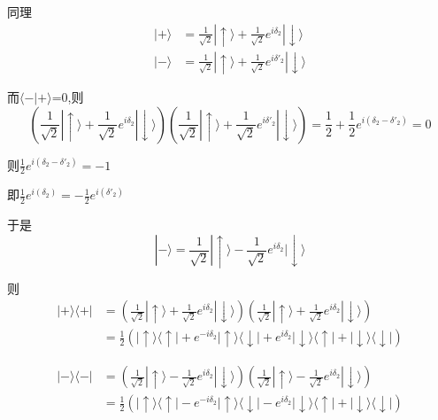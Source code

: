 \documentclass[lang=cn,10pt]{elegantbook}
\begin{document}
 同理
 \begin{equation*}
 	\begin{split}
 		|+\rangle &=\frac{1}{\sqrt{2}}|\uparrow \rangle +\frac{1}{\sqrt{2}}e^{i\delta _2}|\downarrow \rangle 
 		\\
 		|-\rangle &=\frac{1}{\sqrt{2}}|\uparrow \rangle +\frac{1}{\sqrt{2}}e^{i\delta' _2}|\downarrow \rangle 
 	\end{split}
 \end{equation*}
 
 而$\langle -|+\rangle$=0,则
 \begin{equation*}
 	\left( \frac{1}{\sqrt{2}}|\uparrow \rangle +\frac{1}{\sqrt{2}}e^{i\delta _2}|\downarrow \rangle \right) \left( \frac{1}{\sqrt{2}}|\uparrow \rangle +\frac{1}{\sqrt{2}}e^{i\delta' _2}|\downarrow \rangle \right) =\frac{1}{2}+\frac{1}{2}e^{i\left( \delta _2-\delta' _2 \right)}=0
 \end{equation*}
 
 则$\frac{1}{2}e^{i\left( \delta _2-\delta' _2 \right)}=-1$
 
 即$\frac{1}{2}e^{i\left( \delta _2 \right)}=-\frac{1}{2}e^{i\left( \delta' _2 \right)}$
 
 于是
 \begin{equation*}
 	|-\rangle =\frac{1}{\sqrt{2}}|\uparrow \rangle -\frac{1}{\sqrt{2}}e^{i\delta _2}|\downarrow \rangle
 \end{equation*}
 
 则\begin{equation*}
 	\begin{split}
 		|+\rangle \langle +|&=\left( \frac{1}{\sqrt{2}}|\uparrow \rangle +\frac{1}{\sqrt{2}}e^{i\delta _2}|\downarrow \rangle \right) \left( \frac{1}{\sqrt{2}}|\uparrow \rangle +\frac{1}{\sqrt{2}}e^{i\delta _2}|\downarrow \rangle \right) 
 		\\
 		&=\frac{1}{2}\left( |\uparrow \rangle \langle \uparrow |+e^{-i\delta _2}|\uparrow \rangle \langle \downarrow |+e^{i\delta _2}|\downarrow \rangle \langle \uparrow |+|\downarrow \rangle \langle \downarrow | \right) 
 	\end{split}
 \end{equation*}
 
 \begin{equation*}
 	\begin{split}
 		|-\rangle \langle -|&=\left( \frac{1}{\sqrt{2}}|\uparrow \rangle -\frac{1}{\sqrt{2}}e^{i\delta _2}|\downarrow \rangle \right) \left( \frac{1}{\sqrt{2}}|\uparrow \rangle -\frac{1}{\sqrt{2}}e^{i\delta _2}|\downarrow \rangle \right) 
 		\\
 		&=\frac{1}{2}\left( |\uparrow \rangle \langle \uparrow |-e^{-i\delta _2}|\uparrow \rangle \langle \downarrow |-e^{i\delta _2}|\downarrow \rangle \langle \uparrow |+|\downarrow \rangle \langle \downarrow | \right) 
 	\end{split}
 \end{equation*}
 
\end{document}
